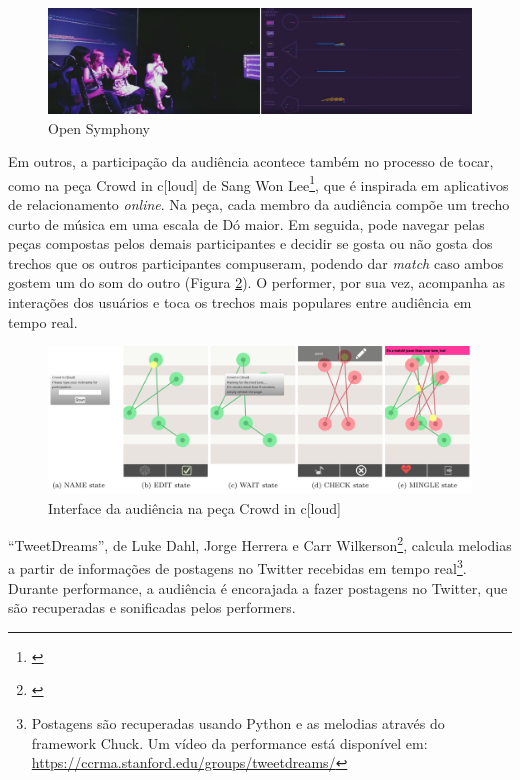 \begin{figure}
    \caption{\label{moodconductor}Open Symphony}
    \begin{center}
        \includegraphics[width=1\linewidth]{pictures/cap3/opensymphony}
    \end{center}
\end{figure}

Em outros, a participação da audiência acontece também no processo de tocar, como na peça Crowd in c[loud] de Sang Won Lee\footnote{\cite{Lee2016}}, que é inspirada em aplicativos de relacionamento \emph{online}. Na peça, cada membro da audiência compõe um trecho curto de música em uma escala de Dó maior. Em seguida, pode navegar pelas peças compostas pelos demais participantes e decidir se gosta ou não gosta dos trechos que os outros participantes compuseram, podendo dar \emph{match} caso ambos gostem um do som do outro (Figura \ref{crowdincloud}). O performer, por sua vez, acompanha as interações dos usuários e toca os trechos mais populares entre audiência em tempo real.

\begin{figure}
    \caption{\label{crowdincloud}Interface da audiência na peça Crowd in c[loud]}
    \begin{center}
        \includegraphics[width=1\linewidth]{pictures/cap3/crowdincloud}
    \end{center}
\end{figure}

``TweetDreams'', de Luke Dahl, Jorge Herrera e Carr Wilkerson\footnote{\cite{Dahl2011}}, calcula melodias a partir de informações de postagens no Twitter recebidas em tempo real\footnote{Postagens são recuperadas usando Python e as melodias através do framework Chuck. Um vídeo da performance está disponível em: \url{https://ccrma.stanford.edu/groups/tweetdreams/}}. Durante performance, a audiência é encorajada a fazer postagens no Twitter, que são recuperadas e sonificadas pelos performers. 


